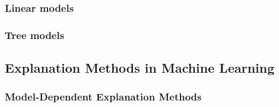 \documentclass[english]{tktltiki2}
\theoremstyle{definition}
\theoremstyle{remark}
\begin{document}
\subsubsection{Linear models}

\subsubsection{Tree models}

\subsection{Explanation Methods in Machine Learning} %


\subsubsection{Model-Dependent Explanation Methods} %
\end{document}
